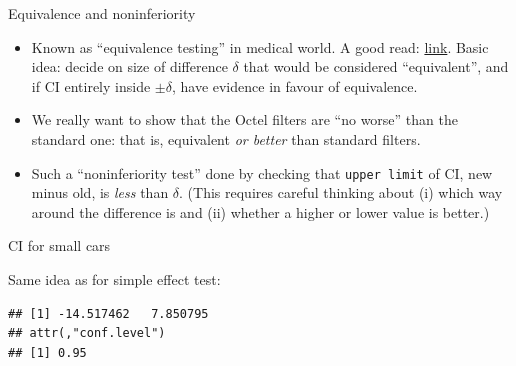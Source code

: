 \documentclass[ignorenonframetext,]{beamer}
\newenvironment{Shaded}{\begin{snugshade}}{\end{snugshade}}
\newcommand{\DataTypeTok}[1]{\textcolor[rgb]{0.13,0.29,0.53}{#1}}
\newcommand{\KeywordTok}[1]{\textcolor[rgb]{0.13,0.29,0.53}{\textbf{#1}}}
\newcommand{\NormalTok}[1]{#1}
\newcommand{\OperatorTok}[1]{\textcolor[rgb]{0.81,0.36,0.00}{\textbf{#1}}}
\newcommand{\StringTok}[1]{\textcolor[rgb]{0.31,0.60,0.02}{#1}}
\begin{document}
\begin{frame}[fragile]{Equivalence and noninferiority}
\protect\hypertarget{equivalence-and-noninferiority}{}

\begin{itemize}
\item
  Known as ``equivalence testing'' in medical world. A good read:
  \href{http://www.ncbi.nlm.nih.gov/pmc/articles/PMC3019319/}{link}.
  Basic idea: decide on size of difference \(\delta\) that would be
  considered ``equivalent'', and if CI entirely inside \(\pm \delta\),
  have evidence in favour of equivalence.
\item
  We really want to show that the Octel filters are ``no worse'' than
  the standard one: that is, equivalent \emph{or better} than standard
  filters.
\item
  Such a ``noninferiority test'' done by checking that
  \texttt{upper\ limit} of CI, new minus old, is \emph{less} than
  \(\delta\). (This requires careful thinking about (i) which way around
  the difference is and (ii) whether a higher or lower value is better.)
\end{itemize}

\end{frame}

\begin{frame}[fragile]{CI for small cars}
\protect\hypertarget{ci-for-small-cars}{}

Same idea as for simple effect test:

\begin{Shaded}
\end{Shaded}

\begin{verbatim}
## [1] -14.517462   7.850795
## attr(,"conf.level")
## [1] 0.95
\end{verbatim}

\end{frame}
\end{document}
